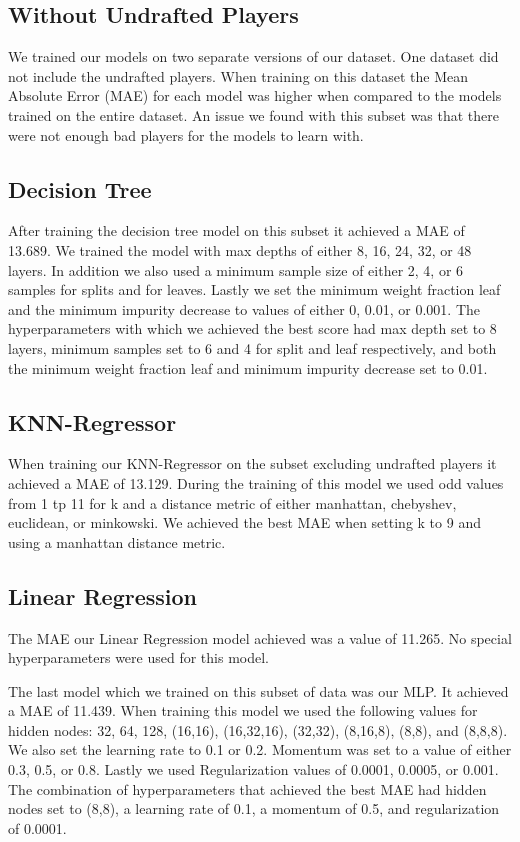 \documentclass{article}
\begin{document}
\subsection{Without Undrafted Players}

We trained our models on two separate versions of our dataset. One dataset did not include
the undrafted players. When training on this dataset the Mean Absolute Error (MAE) for each model was higher 
when compared to the models trained on the entire dataset. An issue we found with this subset was that there
were not enough bad players for the models to learn with.

\subsection{Decision Tree}

After training the decision tree model on this subset it achieved a MAE of 13.689. 
We trained the model with max depths of either 8, 16, 24, 32, or 48 layers. In addition we also used a minimum sample size of either 2, 4, or 6 samples 
for splits and for leaves. Lastly we set the minimum weight fraction leaf and the minimum impurity decrease to values of either 0, 0.01, or 0.001.
The hyperparameters with which we achieved the best score had max depth set to 8 layers, minimum samples set to 6 and 4 for split and leaf respectively, and both the minimum weight fraction leaf and minimum impurity decrease set to 0.01.

\subsection{KNN-Regressor}

When training our KNN-Regressor on the subset excluding undrafted players it achieved a MAE of 13.129.
During the training of this model we used odd values from 1 tp 11 for k and a distance metric of either manhattan, chebyshev, euclidean, or minkowski.
We achieved the best MAE when setting k to 9 and using a manhattan distance metric.
\subsection{Linear Regression}
The MAE our Linear Regression model achieved was a value of 11.265.
No special hyperparameters were used for this model.


The last model which we trained on this subset of data was our MLP. It achieved a MAE of 11.439.
When training this model we used the following values for hidden nodes: 32, 64, 128, (16,16), (16,32,16), (32,32), (8,16,8), (8,8), and (8,8,8).
We also set the learning rate to 0.1 or 0.2. Momentum was set to a value of either 0.3, 0.5, or 0.8. 
Lastly we used Regularization values of 0.0001, 0.0005, or 0.001.
The combination of hyperparameters that achieved the best MAE had hidden nodes set to (8,8), a learning rate of 0.1,
a momentum of 0.5, and regularization of 0.0001.
\end{document}
